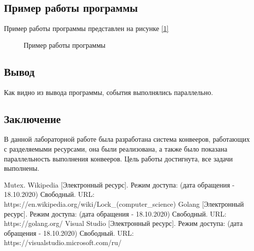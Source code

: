 \documentclass{article}
\begin{document}
	\subsection{Пример работы программы}
	Пример работы программы представлен на рисунке \hyperref[programmWork]{[\ref{programmWork}]}
	 	\begin{figure}[h!]
		 	\caption{Пример работы программы}
		 	\label{programmWork}
	 	\end{figure}
	
	
	\subsection{Вывод}
	Как видно из вывода программы, события выполнялись параллельно. 

	\newpage
	\begin{center}
		\section*{Заключение}
	\end{center}
	\indent \indent В данной лабораторной работе была разработана система конвееров, работающих с разделяемыми ресурсами, она были реализована, а также было показана параллельность выполнения конвееров. Цель работы достигнута, все задачи выполнены.
	\newpage
	
	\begin{center}
	\begin{thebibliography}{3}
	Mutex. Wikipedia [Электронный ресурс]. Режим доступа: (дата обращения - 18.10.2020) Свободный. URL: https://en.wikipedia.org/wiki/Lock\_(computer\_science)
	Golang [Электронный ресурс]. Режим доступа: (дата обращения - 18.10.2020) Свободный. URL: https://golang.org/
	Visual Studio [Электронный ресурс]. Режим доступа: (дата обращения - 18.10.2020) Свободный. URL: https://visualstudio.microsoft.com/ru/

	\end{thebibliography}
	\end{center}
\end{document}
